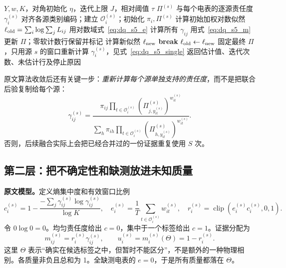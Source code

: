 \begin{algorithm}[tbp]
\caption{S5 的 EM 主循环：原算法顺序，数值保护为教学补充}
\label{alg:dq_s5_em}
\begin{algorithmic}[1]
\Require $Y,w,K$，对角初始化 $\eta$，迭代上限 $J$，相对阈值 $\tau$
\Ensure $\Pi^{(s)}$ 与每个电表的逐源责任度 $\gamma_i^{(s)}$
\State 对齐各源类别编码；建立 $\mathcal O_i^{(s)}$；初始化 $\pi_i,\Pi^{(s)}$
\State 计算初始加权对数似然 $\ell_{\rm old}=\sum_i\log\sum_jL_{ij}$
  \State 用对数域式~\eqref{eq:dq_s5_e} 计算所有 $\gamma_{ij}$
  \State 用式~\eqref{eq:dq_s5_m} 更新 $\Pi$；零软计数行保留并标记
  \State 计算新似然 $\ell_{\rm new}$
    \State \textbf{break}
  \EndIf
  \State $\ell_{\rm old}\gets\ell_{\rm new}$
\EndFor
\State 固定最终 $\Pi$，只用源 $s$ 的窗口重新计算 $\gamma_i^{(s)}$，见式~\eqref{eq:dq_s5_single}
\State 返回估计值、迭代次数、未估计行及停止原因
\end{algorithmic}
\end{algorithm}

原文算法收敛后还有关键一步：\emph{重新计算每个源单独支持的责任度}，而不是把联合后验复制给每个源：
\begin{equation}
 \gamma_{ij}^{(s)}=
 \frac{\pi_{ij}\prod_{t\in\mathcal O_i^{(s)}}
 (\Pi_{j,y_{it}^{(s)}}^{(s)})^{w_{it}^{(s)}}}
 {\sum_h\pi_{ih}\prod_{t\in\mathcal O_i^{(s)}}
 (\Pi_{h,y_{it}^{(s)}}^{(s)})^{w_{it}^{(s)}}}.
 \label{eq:dq_s5_single}
\end{equation}
否则，后续融合实际上会把已经合并过的一份证据重复使用 $S$ 次。

\subsection{第二层：把不确定性和缺测放进未知质量}

\textbf{原文模型。}定义熵集中度和有效窗口比例
\begin{equation}
 c_i^{(s)}=1-\frac{-\sum_j\gamma_{ij}^{(s)}\log\gamma_{ij}^{(s)}}{\log K},
 \quad e_i^{(s)}=\frac1T\sum_{t\in\mathcal O_i^{(s)}}w_{it}^{(s)},
 \quad r_i^{(s)}=\operatorname{clip}(e_i^{(s)}c_i^{(s)},0,1).
 \label{eq:dq_s5_discount}
\end{equation}
令 $0\log0=0$。均匀责任度给出 $c=0$，集中于一个标签给出 $c=1$。证据分配为
\begin{equation}
 m_{ij}^{(s)}=r_i^{(s)}\gamma_{ij}^{(s)},\qquad
 u_i^{(s)}=m_i^{(s)}(\Theta)=1-r_i^{(s)}.
 \label{eq:dq_s5_bpa}
\end{equation}
这里 $\Theta$ 表示“确实在候选标签之中，但暂时不能区分”，不是额外的一种物理相别。各质量非负且总和为 1。全缺测电表的 $e=0$，于是所有质量都落在 $\Theta$。

